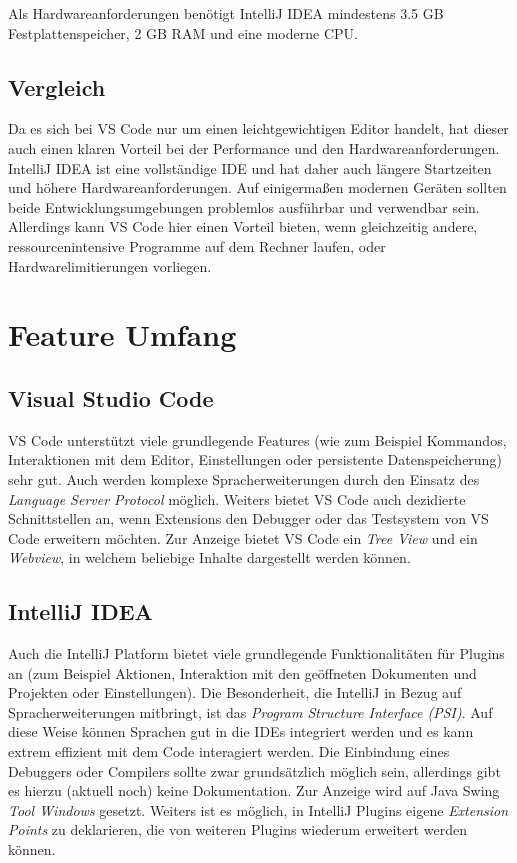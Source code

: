 Als Hardwareanforderungen benötigt IntelliJ IDEA
mindestens 3.5 GB Festplattenspeicher, 2 GB RAM und eine
moderne CPU.

\subsection{Vergleich}

Da es sich bei VS Code nur um einen leichtgewichtigen Editor handelt,
hat dieser auch einen klaren Vorteil bei der Performance 
und den Hardwareanforderungen.
IntelliJ IDEA ist eine vollständige IDE und hat daher auch längere
Startzeiten und höhere Hardwareanforderungen.
Auf einigermaßen modernen Geräten sollten beide Entwicklungsumgebungen
problemlos ausführbar und verwendbar sein. Allerdings kann VS Code hier
einen Vorteil bieten, wenn gleichzeitig andere, ressourcenintensive Programme
auf dem Rechner laufen, oder Hardwarelimitierungen vorliegen.


\section{Feature Umfang}
\label{sec:Vergleich_FeatureUmfang}

\subsection{Visual Studio Code}

VS Code unterstützt viele grundlegende Features (wie zum Beispiel 
Kommandos, Interaktionen mit dem Editor, Einstellungen oder persistente
Datenspeicherung) sehr gut. Auch werden komplexe Spracherweiterungen
durch den Einsatz des \emph{Language Server Protocol} möglich.
Weiters bietet VS Code auch dezidierte Schnittstellen an, wenn Extensions
den Debugger oder das Testsystem von VS Code erweitern möchten.
Zur Anzeige bietet VS Code ein \emph{Tree View} und ein 
\emph{Webview}, in welchem beliebige Inhalte dargestellt werden können.

\subsection{IntelliJ IDEA}

Auch die IntelliJ Platform bietet viele grundlegende Funktionalitäten
für Plugins an (zum Beispiel Aktionen, Interaktion mit den geöffneten Dokumenten
und Projekten oder Einstellungen). Die Besonderheit, die IntelliJ
in Bezug auf Spracherweiterungen
mitbringt, ist das \emph{Program Structure Interface (PSI)}. 
Auf diese Weise können Sprachen gut in die IDEs integriert werden
und es kann extrem effizient mit dem Code interagiert werden.
Die Einbindung eines Debuggers oder Compilers sollte zwar grundsätzlich
möglich sein, allerdings gibt es hierzu (aktuell noch) keine Dokumentation.
Zur Anzeige wird auf Java Swing \emph{Tool Windows} gesetzt.
Weiters ist es möglich, in IntelliJ Plugins eigene 
\emph{Extension Points} zu deklarieren, die von weiteren Plugins
wiederum erweitert werden können.

